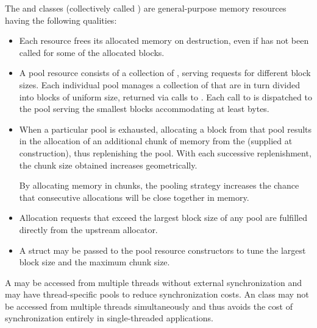 \pnum
The  and
 classes
(collectively called )
are general-purpose memory resources having the following qualities:
\begin{itemize}
\item
Each resource frees its allocated memory on destruction,
even if  has not been called for some of the allocated blocks.
\item
A pool resource consists of a collection of ,
serving requests for different block sizes.
Each individual pool manages a collection of 
that are in turn divided into blocks of uniform size,
returned via calls to .
Each call to  is dispatched
to the pool serving the smallest blocks accommodating at least  bytes.
\item
When a particular pool is exhausted,
allocating a block from that pool results in the allocation
of an additional chunk of memory from the 
(supplied at construction), thus replenishing the pool.
With each successive replenishment,
the chunk size obtained increases geometrically.
\begin{note}
By allocating memory in chunks,
the pooling strategy increases the chance that consecutive allocations
will be close together in memory.\end{note}
\item
Allocation requests that exceed the largest block size of any pool
are fulfilled directly from the upstream allocator.
\item
A  struct may be passed to the pool resource constructors
to tune the largest block size and the maximum chunk size.
\end{itemize}

\pnum
A  may be accessed from multiple threads
without external synchronization
and may have thread-specific pools to reduce synchronization costs.
An  class may not be accessed
from multiple threads simultaneously
and thus avoids the cost of synchronization entirely
in single-threaded applications.

